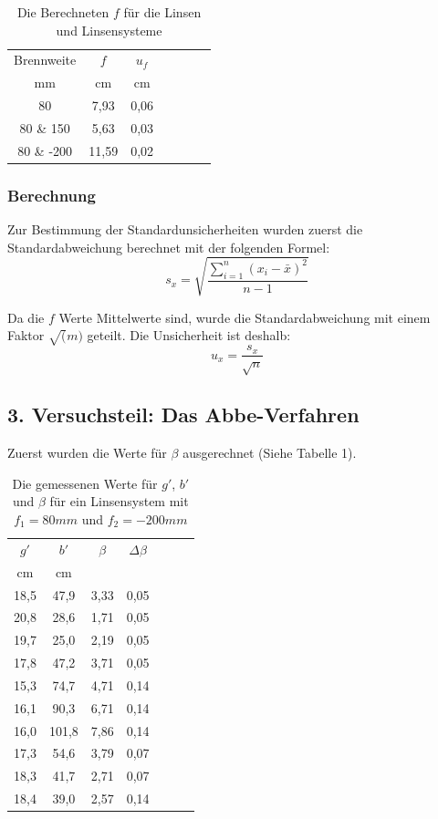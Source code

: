 \documentclass[11pt,a4paper]{article}
\begin{document}
\begin{table} [h]
	\centering
	\begin{tabular*}{0.50\textwidth}{@{\extracolsep{\fill}}c|cccccc}
		\toprule
		Brennweite & $f$ & $u_f$   \\
		mm & cm & cm \\
		\bottomrule
		80 & 7,93 & 0,06 \\
		80 \& 150 & 5,63 & 0,03 \\
		80 \& -200 & 11,59 & 0,02 \\
		\bottomrule
	\end{tabular*}
	\caption{Die Berechneten $f$ für die Linsen und Linsensysteme}
\end{table}

\begin{tcolorbox}[colback=white]
	\subsubsection{Berechnung}
	Zur Bestimmung der Standardunsicherheiten wurden zuerst die Standardabweichung berechnet mit der folgenden Formel:
	$$s_x = \sqrt{\frac{\sum_{i=1}^{n}(x_i-\bar{x})^2}{n-1}} $$
	
	Da die $f$ Werte Mittelwerte sind, wurde die Standardabweichung mit einem Faktor $\sqrt(m)$ geteilt. Die Unsicherheit ist deshalb:
	$$u_x = \frac{s_x}{\sqrt{n}}$$
\end{tcolorbox}

\subsection{3. Versuchsteil: Das Abbe-Verfahren}
Zuerst wurden die Werte für $\beta$ ausgerechnet (Siehe Tabelle 1).



\begin{table}[h]
	\centering
	\begin{tabular*}{0.50\textwidth}{@{\extracolsep{\fill}}cc|ccccc}
		\toprule
		$g'$ & $b'$ & $\beta$ & $\Delta \beta$   \\
		cm & cm& &\\
		18,5&47,9&3,33&0,05\\
		20,8&28,6&1,71&0,05\\
		19,7&25,0&2,19&0,05\\
		17,8&47,2&3,71&0,05\\
		15,3&74,7&4,71&0,14\\
		16,1&90,3&6,71&0,14\\
		16,0&101,8&7,86&0,14\\
		17,3&54,6&3,79&0,07\\
		18,3&41,7&2,71&0,07\\
		18,4&39,0&2,57&0,14\\
		\bottomrule
	\end{tabular*}
	\caption{Die gemessenen Werte für $g'$, $b'$ und $\beta$ für ein Linsensystem mit $f_1 = 80mm$ und $f_2 = -200mm$}
\end{table}
\end{document}
